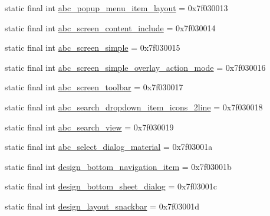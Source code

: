 \begin{CompactItemize}
\item 
static final int \hyperlink{classandroid_1_1support_1_1graphics_1_1drawable_1_1animated_1_1_r_1_1layout_6f4164c9d601fc67b15c4c0fe97bad13}{abc\_\-popup\_\-menu\_\-item\_\-layout} = 0x7f030013
\item 
static final int \hyperlink{classandroid_1_1support_1_1graphics_1_1drawable_1_1animated_1_1_r_1_1layout_0eb7bb5696f082d7284a42d3ad9fbf58}{abc\_\-screen\_\-content\_\-include} = 0x7f030014
\item 
static final int \hyperlink{classandroid_1_1support_1_1graphics_1_1drawable_1_1animated_1_1_r_1_1layout_641427bbe9182e7c95910b73e1ce56cb}{abc\_\-screen\_\-simple} = 0x7f030015
\item 
static final int \hyperlink{classandroid_1_1support_1_1graphics_1_1drawable_1_1animated_1_1_r_1_1layout_c9b0a77d70c2a157e592b396540c7605}{abc\_\-screen\_\-simple\_\-overlay\_\-action\_\-mode} = 0x7f030016
\item 
static final int \hyperlink{classandroid_1_1support_1_1graphics_1_1drawable_1_1animated_1_1_r_1_1layout_13f066f2a5048c03fa96ea27c9459c6e}{abc\_\-screen\_\-toolbar} = 0x7f030017
\item 
static final int \hyperlink{classandroid_1_1support_1_1graphics_1_1drawable_1_1animated_1_1_r_1_1layout_e01d7b30501abeebb83b4c446927f98d}{abc\_\-search\_\-dropdown\_\-item\_\-icons\_\-2line} = 0x7f030018
\item 
static final int \hyperlink{classandroid_1_1support_1_1graphics_1_1drawable_1_1animated_1_1_r_1_1layout_69b65f6767ab3c8364ba1df6f53ca633}{abc\_\-search\_\-view} = 0x7f030019
\item 
static final int \hyperlink{classandroid_1_1support_1_1graphics_1_1drawable_1_1animated_1_1_r_1_1layout_314ab8dfddfeac0186719ad9c6b8f9fe}{abc\_\-select\_\-dialog\_\-material} = 0x7f03001a
\item 
static final int \hyperlink{classandroid_1_1support_1_1graphics_1_1drawable_1_1animated_1_1_r_1_1layout_1949c4b9c8270b9c14e6af29c7dd7b58}{design\_\-bottom\_\-navigation\_\-item} = 0x7f03001b
\item 
static final int \hyperlink{classandroid_1_1support_1_1graphics_1_1drawable_1_1animated_1_1_r_1_1layout_5a794829922576c1825350b09a58e196}{design\_\-bottom\_\-sheet\_\-dialog} = 0x7f03001c
\item 
static final int \hyperlink{classandroid_1_1support_1_1graphics_1_1drawable_1_1animated_1_1_r_1_1layout_764b6fab518c0ec000ff92d79a630f83}{design\_\-layout\_\-snackbar} = 0x7f03001d
\item 

\end{CompactItemize}
